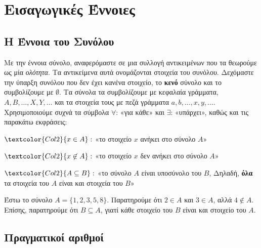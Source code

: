 \chapter{Εισαγωγικές Έννοιες}


\section{Η Έννοια του Συνόλου}

Με την έννοια \textcolor{Col1}{σύνολο}, αναφερόμαστε σε μια συλλογή αντικειμένων που τα 
θεωρούμε ως μία \textit{ολότητα}. 
Τα αντικείμενα αυτά ονομάζονται \textcolor{Col1}{στοιχεία} του 
συνόλου. Δεχόμαστε την ύπαρξη συνόλου που δεν έχει κανένα στοιχείο, το \textbf{κενό} 
σύνολο και το συμβολίζουμε με $ \emptyset $. Τα σύνολα τα συμβολίζουμε με κεφαλαία
γράμματα, $ A, B, \ldots, X, Y, \ldots $ και τα στοιχεία τους με πεζά γράμματα $ a,b,
\ldots, x,y, \ldots $. Χρησιμοποιούμε συχνά τα σύμβολα $ \forall $:
«\textcolor{Col1}{για κάθε}» και $ \exists $: «\textcolor{Col1}{υπάρχει}», 
καθώς και τις παρακάτω εκφράσεις:
\begin{center}
  \begin{myitemize}
    \item $ \textcolor{Col2}{x \in A} : $ «το στοιχείο $x$ \textcolor{Col1}{ανήκει} στο 
      σύνολο $A$» \\
    \item $ \textcolor{Col2}{x \not\in A} : $ «το στοιχείο $x$ \textcolor{Col1}{δεν 
      ανήκει} στο σύνολο $A$» \\
    \item $\textcolor{Col2}{A \subseteq B} :$ «το σύνολο $A$ είναι
      \textcolor{Col1}{υποσύνολο} του $B$, Δηλαδή, \textbf{όλα} τα στοιχεία του $A$ είναι
      και στοιχεία του $B$»
  \end{myitemize}
\end{center}

\begin{example}
  Έστω το σύνολο $ A = \{ 1,2,3,5,8 \} $. Παρατηρούμε ότι $ 2 \in A $ και $ 3 \in A $, 
  αλλά $ 4 \not \in A $. Επίσης, παρατηρούμε ότι $ B \subseteq A $, γιατί κάθε στοιχείο 
  του $B$ είναι και στοιχείο του $A$.
\end{example}


\section{Πραγματικοί αριθμοί} 

\enlargethispage{3\baselineskip}

